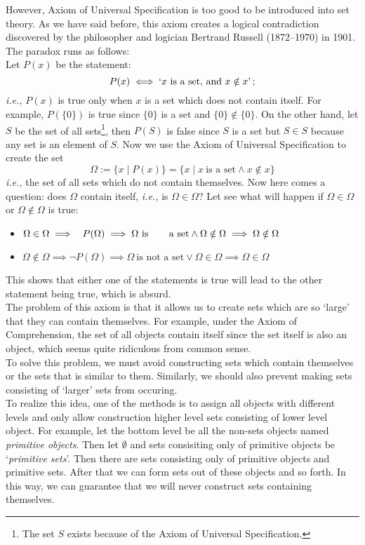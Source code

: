 \documentclass[a4paper]{book}
\theoremstyle{break}
\begin{document}
			However, Axiom of Universal Specification is too good to be introduced into set theory. As we have said before, this axiom creates a logical contradiction discovered by the philosopher and logician Bertrand Russell (1872--1970) in 1901. The paradox runs as follows:\\
			Let $P(x)$ be the statement:
			$$P(x)\iff `x~\text{is a set, and}~x\notin x\text{'}\,;$$
			\textit{i.e.,} $P(x)$ is true only when $x$ is a set which does not contain itself. For example, $P(\{0\})$ is true since $\{0\}$ is a set and $\{0\}\notin\{0\}$. On the other hand, let $S$ be the set of all sets\footnote{The set $S$ exists because of the Axiom of Universal Specification.}, then $P(S)$ is false since $S$ is a set but $S\in S$ because any set is an element of $S$. Now we use the Axiom of Universal Specification to create the set
			$$\Omega:=\{x\mid P(x)\}=\{x\mid x~\text{is a set}\land x\notin x\}$$
			\textit{i.e.,} the set of all sets which do not contain themselves. Now here comes a question: does $\Omega$ contain itself, \textit{i.e.,} is $\Omega\in\Omega$? Let see what will happen if $\Omega\in\Omega$ or $\Omega\notin\Omega$ is true:
			\begin{itemize}
				\item $\Omega\in\Omega\implies\phantom{\lnot} P(\Omega)\implies\Omega~\text{is\phantom{~not~}a set}\land\Omega\notin\Omega\implies\Omega\notin\Omega$
				\item $\Omega\notin\Omega\implies\lnot P(\Omega)\implies\Omega~\text{is not a set}\lor\Omega\in\Omega\implies\Omega\in\Omega$
			\end{itemize}
			This shows that either one of the statements is true will lead to the other statement being true, which is absurd.\\
			The problem of this axiom is that it allows us to create sets which are so `large' that they can contain themselves. For example, under the Axiom of Comprehension, the set of all objects contain itself since the set itself is also an object, which seems quite ridiculous from common sense.\\
			To solve this problem, we must avoid constructing sets which contain themselves or the sets that is similar to them. Similarly, we should also prevent making sets consisting of `larger' sets from occuring.\\
			To realize this idea, one of the methods is to assign all objects with different levels and only allow construction higher level sets consisting of lower level object. For example, let the bottom level be all the non-sets objects named \textit{primitive objects}. Then let $\emptyset$ and sets consisiting only of primitive objects be `\textit{primitive sets}'. Then there are sets consisting only of primitive objects and primitive sets. After that we can form sets out of these objects and so forth. In this way, we can guarantee that we will never construct sets containing themselves.\\
\end{document}
